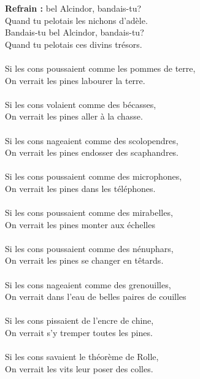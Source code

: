 
\textbf{Refrain : }
 bel Alcindor, bandais-tu?
\\Quand tu pelotais les nichons d'adèle.
\\Bandais-tu bel Alcindor, bandais-tu?
\\Quand tu pelotais ces divins trésors.
\\\\Si les cons poussaient comme les pommes de terre,
\\On verrait les pines labourer la terre.
\\\\Si les cons volaient comme des bécasses,
\\On verrait les pines aller à la chasse.
\\\\Si les cons nageaient comme des scolopendres,
\\On verrait les pines endosser des scaphandres.
\\\\Si les cons poussaient comme des microphones,
\\On verrait les pines dans les téléphones.
\\\\Si les cons poussaient comme des mirabelles,
\\On verrait les pines monter aux échelles
\\\\Si les cons poussaient comme des nénuphars,
\\On verrait les pines se changer en têtards.
\\\\Si les cons nageaient comme des grenouilles,
\\On verrait dans l'eau de belles paires de couilles
\\\\Si les cons pissaient de l'encre de chine,
\\On verrait s'y tremper toutes les pines.
\\\\Si les cons savaient le théorème de Rolle,
\\On verrait les vits leur poser des colles.
\breakpage